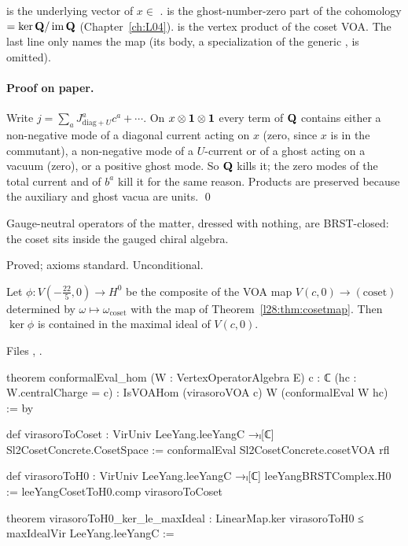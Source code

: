 \begin{dictionary}
 is the underlying vector of $x\in$ .  is the ghost-number-zero part of the
cohomology  $=\ker\mathbf Q/\operatorname{im}\mathbf Q$ (Chapter~\ref{ch:L04}).  is the vertex product of the
coset VOA. The last line only names the map (its body, a specialization of the generic , is omitted).
\end{dictionary}

\paragraph{Proof on paper.} Write $j=\sum_aJ^a_{\mathrm{diag}+U}c^a+\cdots$. On $x\otimes\mathbf 1\otimes\mathbf 1$ every term of
$\mathbf Q$ contains either a non-negative mode of a diagonal current acting on $x$ (zero, since $x$ is in the commutant), a non-negative
mode of a $U$-current or of a ghost acting on a vacuum (zero), or a positive ghost mode. So $\mathbf Q$ kills it; the zero modes of the
total current and of $b^a$ kill it for the same reason. Products are preserved because the auxiliary and ghost vacua are units. \qed

\begin{physics}
Gauge-neutral operators of the matter, dressed with nothing, are BRST-closed: the coset sits inside the gauged chiral algebra.
\end{physics}

\begin{status}
Proved; axioms standard. Unconditional.
\end{status}

\begin{theorem}\label{l28:thm:virimage}
Let $\phi:V(-\tfrac{22}{5},0)\to H^0$ be the composite of the VOA map $V(c,0)\to(\text{coset})$ determined by $\omega\mapsto\omega_{\mathrm{coset}}$
with the map of Theorem~\ref{l28:thm:cosetmap}. Then $\ker\phi$ is contained in the maximal ideal of $V(c,0)$.
\end{theorem}

\noindent Files ,
.
\begin{leancode}
theorem conformalEval_hom (W : VertexOperatorAlgebra E) {c : ℂ}
    (hc : W.centralCharge = c) :
    IsVOAHom (virasoroVOA c) W (conformalEval W hc) := by

def virasoroToCoset : VirUniv LeeYang.leeYangC →ₗ[ℂ] Sl2CosetConcrete.CosetSpace :=
  conformalEval Sl2CosetConcrete.cosetVOA rfl

def virasoroToH0 : VirUniv LeeYang.leeYangC →ₗ[ℂ] leeYangBRSTComplex.H0 :=
  leeYangCosetToH0.comp virasoroToCoset

theorem virasoroToH0_ker_le_maxIdeal :
    LinearMap.ker virasoroToH0 ≤ maxIdealVir LeeYang.leeYangC :=
\end{leancode}

